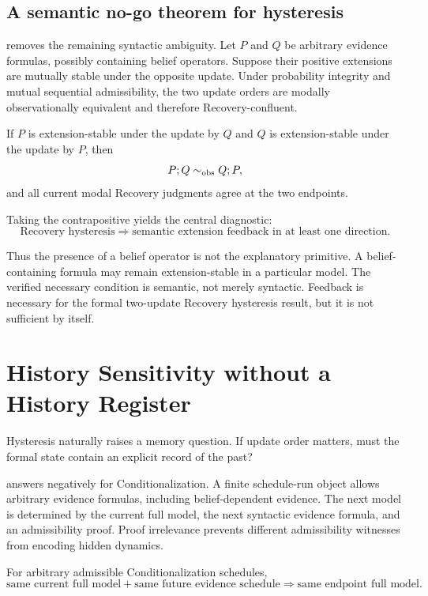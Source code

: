 \subsection{A semantic no-go theorem for hysteresis}

 removes the remaining syntactic ambiguity. Let $P$ and $Q$ be arbitrary evidence formulas, possibly containing belief operators. Suppose their positive extensions are mutually stable under the opposite update. Under probability integrity and mutual sequential admissibility, the two update orders are modally observationally equivalent and therefore Recovery-confluent.

\begin{theorem}
If $P$ is extension-stable under the update by $Q$ and $Q$ is extension-stable under the update by $P$, then
\[
P;Q\mathrel{\sim_{\mathrm{obs}}} Q;P,
\]
and all current modal Recovery judgments agree at the two endpoints.
\end{theorem}

Taking the contrapositive yields the central diagnostic:
\[
\boxed{
\text{Recovery hysteresis}
\Longrightarrow
\text{semantic extension feedback in at least one direction}.
}
\]

Thus the presence of a belief operator is not the explanatory primitive. A belief-containing formula may remain extension-stable in a particular model. The verified necessary condition is semantic, not merely syntactic. Feedback is necessary for the formal two-update Recovery hysteresis result, but it is not sufficient by itself.

\section{History Sensitivity without a History Register}

Hysteresis naturally raises a memory question. If update order matters, must the formal state contain an explicit record of the past?

 answers negatively for Conditionalization. A finite schedule-run object allows arbitrary evidence formulas, including belief-dependent evidence. The next model is determined by the current full model, the next syntactic evidence formula, and an admissibility proof. Proof irrelevance prevents different admissibility witnesses from encoding hidden dynamics.

\begin{theorem}
For arbitrary admissible Conditionalization schedules,
\[
\boxed{
\text{same current full model}
+
\text{same future evidence schedule}
\Longrightarrow
\text{same endpoint full model}.
}
\]
\end{theorem}

